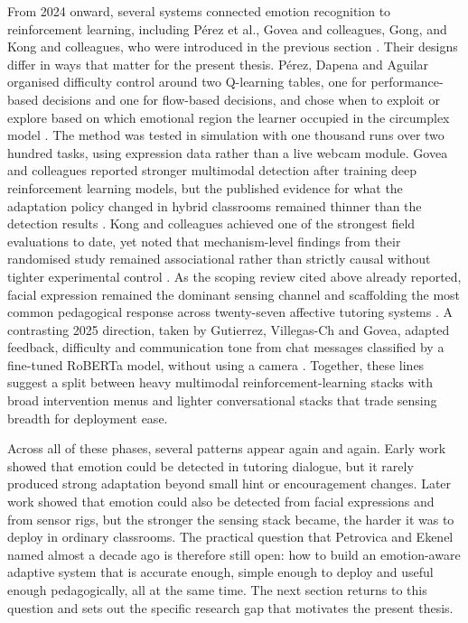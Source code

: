 From 2024 onward, several systems connected emotion recognition to reinforcement learning, including Pérez et al., Govea and colleagues, Gong, and Kong and colleagues, who were introduced in the previous section \cite{perez_emotions_2024,govea_implementation_2024,gong_design_2025,kong_real-time_2025}. Their designs differ in ways that matter for the present thesis. Pérez, Dapena and Aguilar organised difficulty control around two Q-learning tables, one for performance-based decisions and one for flow-based decisions, and chose when to exploit or explore based on which emotional region the learner occupied in the circumplex model \cite{perez_emotions_2024}. The method was tested in simulation with one thousand runs over two hundred tasks, using expression data rather than a live webcam module. Govea and colleagues reported stronger multimodal detection after training deep reinforcement learning models, but the published evidence for what the adaptation policy changed in hybrid classrooms remained thinner than the detection results \cite{govea_implementation_2024}. Kong and colleagues achieved one of the strongest field evaluations to date, yet noted that mechanism-level findings from their randomised study remained associational rather than strictly causal without tighter experimental control \cite{kong_real-time_2025}. As the scoping review cited above already reported, facial expression remained the dominant sensing channel and scaffolding the most common pedagogical response across twenty-seven affective tutoring systems \cite{fernandez-herrero_evaluating_2024}. A contrasting 2025 direction, taken by Gutierrez, Villegas-Ch and Govea, adapted feedback, difficulty and communication tone from chat messages classified by a fine-tuned RoBERTa model, without using a camera \cite{gutierrez_development_2025}. Together, these lines suggest a split between heavy multimodal reinforcement-learning stacks with broad intervention menus and lighter conversational stacks that trade sensing breadth for deployment ease.

Across all of these phases, several patterns appear again and again. Early work showed that emotion could be detected in tutoring dialogue, but it rarely produced strong adaptation beyond small hint or encouragement changes. Later work showed that emotion could also be detected from facial expressions and from sensor rigs, but the stronger the sensing stack became, the harder it was to deploy in ordinary classrooms. The practical question that Petrovica and Ekenel named almost a decade ago \cite{petrovica_emotion_2016} is therefore still open: how to build an emotion-aware adaptive system that is accurate enough, simple enough to deploy and useful enough pedagogically, all at the same time. The next section returns to this question and sets out the specific research gap that motivates the present thesis.

